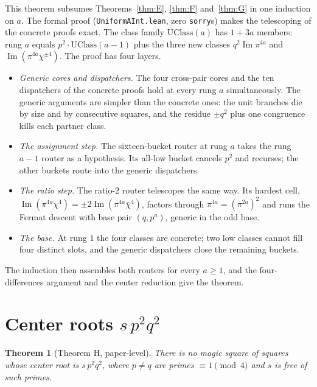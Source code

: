 \documentclass[11pt]{article}
\newtheorem{theorem}{Theorem}
\theoremstyle{remark}
\DeclareMathOperator{\im}{Im}
\begin{document}
This theorem subsumes Theorems~\ref{thm:E}, \ref{thm:F} and~\ref{thm:G} in
one induction on $a$.  The formal proof (\texttt{UniformAInt.lean}, zero
\texttt{sorry}s) makes the telescoping of the concrete proofs exact.  The
class family $\mathrm{UClass}(a)$ has $1+3a$ members: rung $a$ equals
$p^2\cdot\mathrm{UClass}(a-1)$ plus the three new classes
$q^2\im\pi^{4a}$ and $\im(\pi^{4a}\chi^{\pm4})$.  The proof has four layers.
\begin{itemize}
\item \emph{Generic cores and dispatchers.}  The four cross-pair cores and
the ten dispatchers of the concrete proofs hold at every rung $a$
simultaneously.  The generic arguments are simpler than the concrete ones:
the unit branches die by size and by consecutive squares, and the residue
$\pm q^2$ plus one congruence kills each partner class.
\item \emph{The assignment step.}  The sixteen-bucket router at rung $a$
takes the rung $a-1$ router as a hypothesis.  Its all-low bucket cancels
$p^2$ and recurses; the other buckets route into the generic dispatchers.
\item \emph{The ratio step.}  The ratio-$2$ router telescopes the same way.
Its hardest cell, $\im(\pi^{4a}\chi^4)=\pm2\im(\pi^{4a}\bar\chi^4)$, factors
through $\pi^{4a}=(\pi^{2a})^2$ and runs the Fermat descent with base pair
$(q,p^a)$, generic in the odd base.
\item \emph{The base.}  At rung $1$ the four classes are concrete; two low
classes cannot fill four distinct slots, and the generic dispatchers close
the remaining buckets.
\end{itemize}
The induction then assembles both routers for every $a\ge 1$, and the
four-differences argument and the center reduction give the theorem.

\section{Center roots $s\,p^2q^2$}

\begin{theorem}[Theorem H, paper-level]\label{thm:H}
There is no magic square of squares whose center root is $s\,p^2q^2$, where
$p\neq q$ are primes $\equiv 1\pmod 4$ and $s$ is free of such primes.
\end{theorem}
\end{document}
